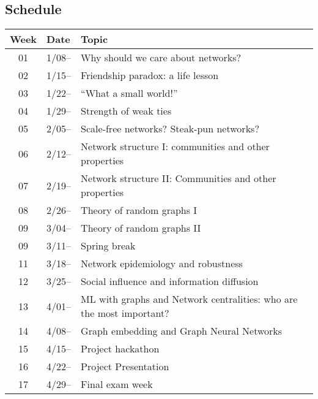 \subsection{Schedule}\label{sub:schedule}%

\begin{tabular}{@{}cll@{}} \toprule
  Week & Date & Topic \\\midrule
  01 & 1/08-- & Why should we care about networks? \\
  02 & 1/15-- & Friendship paradox: a life lesson \\
  03 & 1/22-- & ``What a small world!'' \\
  04 & 1/29-- & Strength of weak ties \\
  05 & 2/05-- & Scale-free networks? Steak-pun networks? \\
  06 & 2/12-- & Network structure I: communities and other properties  \\
  07 & 2/19-- & Network structure II: Communities and other properties  \\
  08 & 2/26-- & Theory of random graphs I \\
  09 & 3/04-- & Theory of random graphs II \\
  09 & 3/11-- & Spring break \\
  11 & 3/18-- & Network epidemiology and robustness \\
  12 & 3/25-- & Social influence and information diffusion \\
  13 & 4/01-- & ML with graphs and Network centralities: who are the most important? \\
  14 & 4/08-- & Graph embedding and Graph Neural Networks \\
  15 & 4/15-- & Project hackathon \\
  16 & 4/22-- & Project Presentation \\
  17 & 4/29-- & Final exam week \\
  \bottomrule
\end{tabular}


